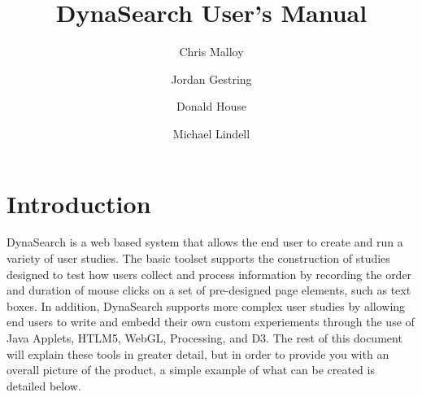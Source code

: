 \documentclass[article]{ij4uq}              %
\begin{document}
\title{DynaSearch User's Manual}
\titlehead{DynaSearch User's Manual}


\author[1]{Chris Malloy}
\author[1]{Jordan Gestring}
\author[1]{Donald House}
\author[2]{Michael Lindell}
\address[1]{ School of Computing, 100 McAdams Hall, Clemson University, Clemson, SC 29634-0974, USA}
\address[2]{Hazard Reduction \& Recovery Center, College of Architecture, Texas A\&M University, College Station, TX 77843-3137, USA}






\dataO{\mydate\today}
\dataF{\mydate\today}

\abstract{
}




\maketitle




\section{Introduction}

DynaSearch is a web based system that allows the end user to create and run a variety of user studies.  The basic toolset supports the construction of studies designed to test how users collect and process information by recording the order and duration of mouse clicks on a set of pre-designed page elements, such as text boxes.  In addition, DynaSearch supports more complex user studies by allowing end users to write and embedd their own custom experiements through the use of Java Applets, HTLM5, WebGL, Processing, and D3.  The rest of this document will explain these tools in greater detail, but in order to provide you with an overall picture of the product, a simple example of what can be created is detailed below.
\end{document}
